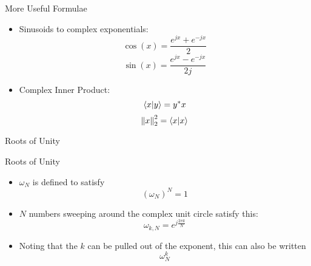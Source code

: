 \begin{frame}{More Useful Formulae}
  \begin{itemize}
    \item Sinusoids to complex exponentials:
    \begin{equation}
      \cos(x) = \frac{e^{jx}+e^{-jx}}{2}
    \end{equation}
    \begin{equation}
      \sin(x) = \frac{e^{jx}-e^{-jx}}{2j}
    \end{equation}
  \item Complex Inner Product:
    \begin{equation*}
      \innerproduct{x}{y} = y^* x
    \end{equation*}
    \begin{equation*}
      \norm{x}_2^2 = \innerproduct{x}{x} 
    \end{equation*}
  \end{itemize}
\end{frame}

\begin{frame}{Roots of Unity}
  \begin{center}
  \def\n{5}
  \end{center}
\end{frame}

\begin{frame}{Roots of Unity}
  \begin{itemize}
    \item {} $\omega_N$ is defined to satisfy
      \begin{equation*}
        (\omega_N)^N = 1
      \end{equation*}
    \item $N$ numbers sweeping around the complex unit circle satisfy this:
      \begin{equation*}
        \omega_{k,N} = e^{j \frac{2 \pi k}{N}}
      \end{equation*}
    \item Noting that the $k$ can be pulled out of the exponent, this can also be written
      \begin{equation*}
        \omega_N^k
      \end{equation*}
  \end{itemize}
\end{frame}

